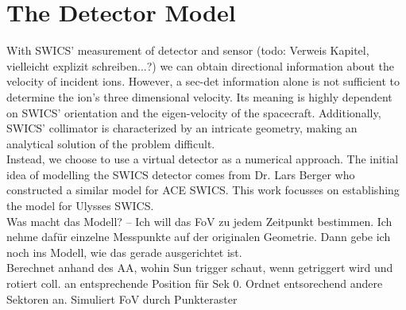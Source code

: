 \section{The Detector Model}
With SWICS' measurement of detector and sensor (todo: Verweis Kapitel, vielleicht explizit schreiben...?) we can obtain directional information about the velocity of incident ions. However, a sec-det information alone is not sufficient to determine the ion's three dimensional velocity. Its meaning is highly dependent on SWICS' orientation and the eigen-velocity of the spacecraft. Additionally, SWICS' collimator is characterized by an intricate geometry, making an analytical solution of the problem difficult. \\
Instead, we choose to use a virtual detector as a numerical approach. The initial idea of modelling the SWICS detector comes from Dr. Lars Berger who constructed a similar model for ACE SWICS. This work focusses on establishing the model for Ulysses SWICS.\\



Was macht das Modell? -- Ich will das FoV zu jedem Zeitpunkt bestimmen. Ich nehme dafür einzelne Messpunkte auf der originalen Geometrie. Dann gebe ich noch ins Modell, wie das gerade ausgerichtet ist.\\
Berechnet anhand des AA, wohin Sun trigger schaut, wenn getriggert wird und rotiert coll. an entsprechende Position für Sek 0. Ordnet entsorechend andere Sektoren an.
Simuliert FoV durch Punkteraster \\


